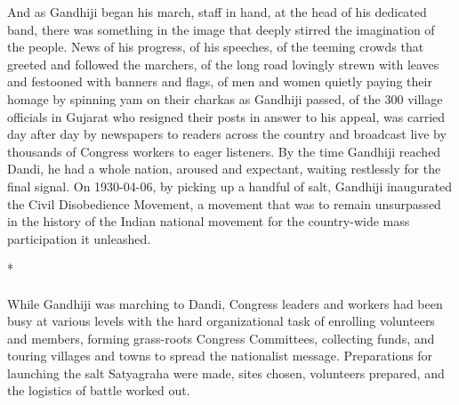 \begin{multicols}{2}
And as Gandhiji began his march, staff in hand, at the head of his dedicated band, there was something in the image that deeply stirred the imagination of the people. News of his progress, of his speeches, of the teeming crowds that greeted and followed the marchers, of the long road lovingly strewn with leaves and festooned with banners and flags, of men and women quietly paying their homage by spinning yam on their charkas as Gandhiji passed, of the 300 village officials in Gujarat who resigned their posts in answer to his appeal, was carried day after day by newspapers to readers across the country and broadcast live by thousands of Congress workers to eager listeners. By the time Gandhiji reached Dandi, he had a whole nation, aroused and expectant, waiting restlessly for the final signal. On 1930-04-06, by picking up a handful of salt, Gandhiji inaugurated the Civil Disobedience Movement, a movement that was to remain unsurpassed in the history of the Indian national movement for the country-wide mass participation it unleashed.

\begin{center}*\end{center}

\paragraph*{}
While Gandhiji was marching to Dandi, Congress leaders and workers had been busy at various levels with the hard organizational task of enrolling volunteers and members, forming grass-roots Congress Committees, collecting funds, and touring villages and towns to spread the nationalist message. Preparations for launching the salt Satyagraha were made, sites chosen, volunteers prepared, and the logistics of battle worked out.


\end{multicols}
